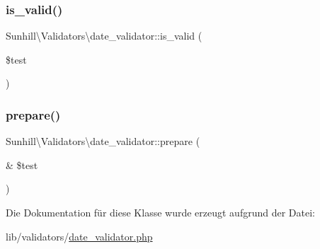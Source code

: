 \subsubsection{\texorpdfstring{is\+\_\+valid()}{is\_valid()}}
{\footnotesize\ttfamily Sunhill\textbackslash{}\+Validators\textbackslash{}date\+\_\+validator\+::is\+\_\+valid (\begin{DoxyParamCaption}\item[{}]{\$test }\end{DoxyParamCaption})\hspace{0.3cm}{\ttfamily [protected]}}

\mbox{\label{classSunhill_1_1Validators_1_1date__validator_a13f2840fbc48e86123cf9057747e4dcd}} 
\subsubsection{\texorpdfstring{prepare()}{prepare()}}
{\footnotesize\ttfamily Sunhill\textbackslash{}\+Validators\textbackslash{}date\+\_\+validator\+::prepare (\begin{DoxyParamCaption}\item[{\&}]{\$test }\end{DoxyParamCaption})\hspace{0.3cm}{\ttfamily [protected]}}



Die Dokumentation für diese Klasse wurde erzeugt aufgrund der Datei\+:\begin{DoxyCompactItemize}
\item 
lib/validators/\hyperlink{date__validator_8php}{date\+\_\+validator.\+php}\end{DoxyCompactItemize}
